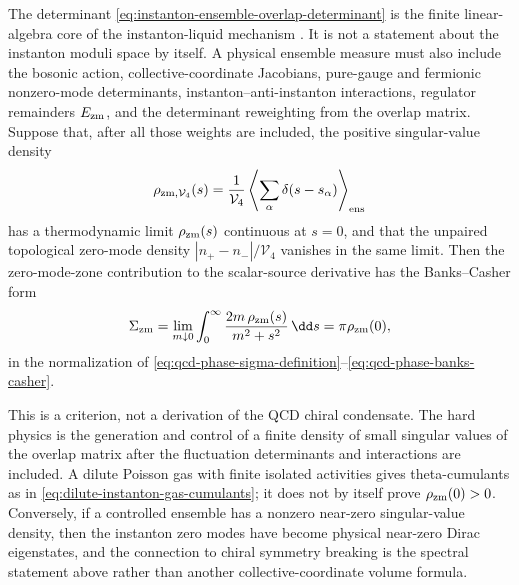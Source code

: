 \begin{controlledapproximation}
\label{ca:instanton-liquid-spectral-density-criterion}
The determinant \eqref{eq:instanton-ensemble-overlap-determinant} is the finite
linear-algebra core of the instanton-liquid mechanism
\cite{DiakonovPetrov1986InstantonVacuum}.  It is not a statement about the
instanton moduli space by itself.  A physical ensemble measure must also include
the bosonic action, collective-coordinate Jacobians, pure-gauge and fermionic
nonzero-mode determinants, instanton--anti-instanton interactions, regulator
remainders \(E_{\rm zm}\), and the determinant reweighting from the overlap
matrix.  Suppose that, after all those weights are included, the positive
singular-value density
\begin{equation}
  \rho_{\rm zm,\mathcal V_4}(s)
  =
  \frac1{\mathcal V_4}
  \left\langle
    \sum_{\alpha}\delta(s-s_\alpha)
  \right\rangle_{\rm ens}
  \label{eq:instanton-liquid-singular-density}
\end{equation}
has a thermodynamic limit \(\rho_{\rm zm}(s)\) continuous at \(s=0\), and that
the unpaired topological zero-mode density
\(|n_+-n_-|/\mathcal V_4\) vanishes in the same limit.  Then the zero-mode-zone
contribution to the scalar-source derivative has the Banks--Casher form
\begin{equation}
  \Sigma_{\rm zm}
  =
  \lim_{m\downarrow0}
  \int_0^\infty
  \frac{2m\,\rho_{\rm zm}(s)}{m^2+s^2}\,\dd s
  =
  \pi\rho_{\rm zm}(0),
  \label{eq:instanton-liquid-banks-casher-criterion}
\end{equation}
in the normalization of
\eqref{eq:qcd-phase-sigma-definition}--\eqref{eq:qcd-phase-banks-casher}.

This is a criterion, not a derivation of the QCD chiral condensate.  The hard
physics is the generation and control of a finite density of small singular
values of the overlap matrix after the fluctuation determinants and interactions
are included.  A dilute Poisson gas with finite isolated activities gives
theta-cumulants as in \eqref{eq:dilute-instanton-gas-cumulants}; it does not by
itself prove \(\rho_{\rm zm}(0)>0\).  Conversely, if a controlled ensemble has a
nonzero near-zero singular-value density, then the instanton zero modes have
become physical near-zero Dirac eigenstates, and the connection to chiral
symmetry breaking is the spectral statement above rather than another
collective-coordinate volume formula.
\end{controlledapproximation}

